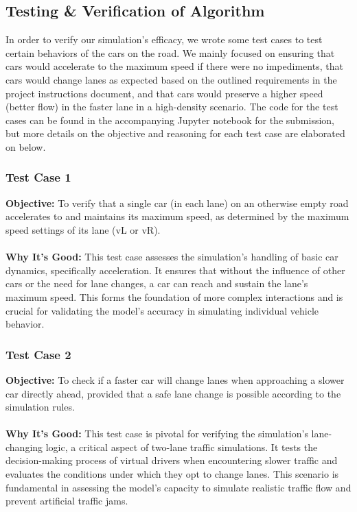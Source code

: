 \documentclass{article}
\begin{document}
\subsection{Testing \& Verification of Algorithm}
In order to verify our simulation's efficacy, we wrote some test cases to test certain behaviors of the cars on the road. We mainly focused on ensuring that cars would accelerate to the maximum speed if there were no impediments, that cars would change lanes as expected based on the outlined requirements in the project instructions document, and that cars would preserve a higher speed (better flow) in the faster lane in a high-density scenario. The code for the test cases can be found in the accompanying Jupyter notebook for the submission, but more details on the objective and reasoning for each test case are elaborated on below. 

\subsubsection{Test Case 1}
\textbf{Objective:} To verify that a single car (in each lane) on an otherwise empty road accelerates to and maintains its maximum speed, as determined by the maximum speed settings of its lane (vL or vR). \\\\
\textbf{Why It's Good:} This test case assesses the simulation's handling of basic car dynamics, specifically acceleration. It ensures that without the influence of other cars or the need for lane changes, a car can reach and sustain the lane's maximum speed. This forms the foundation of more complex interactions and is crucial for validating the model's accuracy in simulating individual vehicle behavior.

\subsubsection{Test Case 2}
\textbf{Objective:} To check if a faster car will change lanes when approaching a slower car directly ahead, provided that a safe lane change is possible according to the simulation rules.\\\\
\textbf{Why It's Good:} This test case is pivotal for verifying the simulation's lane-changing logic, a critical aspect of two-lane traffic simulations. It tests the decision-making process of virtual drivers when encountering slower traffic and evaluates the conditions under which they opt to change lanes. This scenario is fundamental in assessing the model's capacity to simulate realistic traffic flow and prevent artificial traffic jams.
\end{document}
